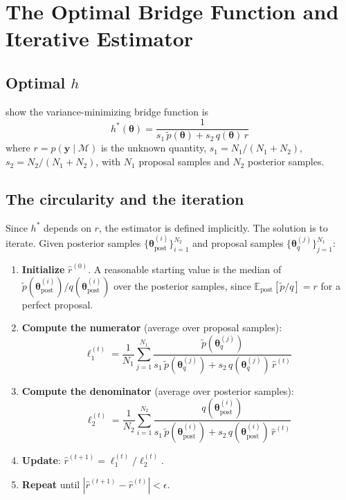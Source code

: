 \documentclass[11pt]{article}
\newcommand{\E}{\mathbb{E}}
\newcommand{\bth}{\boldsymbol{\theta}}
\newcommand{\by}{\mathbf{y}}
\newcommand{\cM}{\mathcal{M}}
\newcommand{\ptilde}{\tilde{p}}
\theoremstyle{plain}
\theoremstyle{definition}
\begin{document}
\section{The Optimal Bridge Function and Iterative Estimator}

\subsection{Optimal $h$}

\citet{MengWong1996} show the variance-minimizing bridge function is
\begin{equation}
  \label{eq:optimal_h}
  h^*(\bth) = \frac{1}{s_1\, \ptilde(\bth) + s_2\, q(\bth)\, r}
\end{equation}
where $r = p(\by \mid \cM)$ is the unknown quantity,
$s_1 = N_1 / (N_1 + N_2)$, $s_2 = N_2 / (N_1 + N_2)$, with $N_1$ proposal
samples and $N_2$ posterior samples.

\subsection{The circularity and the iteration}

Since $h^*$ depends on $r$, the estimator is defined implicitly. The solution
is to iterate. Given posterior samples
$\{\bth^{(i)}_\text{post}\}_{i=1}^{N_2}$ and proposal samples
$\{\bth^{(j)}_q\}_{j=1}^{N_1}$:

\begin{enumerate}[label=\textbf{Step \arabic*.}, leftmargin=2.5cm]
  \item \textbf{Initialize} $\hat{r}^{(0)}$. A reasonable starting value is
    the median of $\ptilde(\bth^{(i)}_\text{post}) / q(\bth^{(i)}_\text{post})$
    over the posterior samples, since
    $\E_\text{post}[\ptilde / q] = r$ for a perfect proposal.

  \item \textbf{Compute the numerator} (average over proposal samples):
    \begin{equation}
      \label{eq:numerator}
      \ell_1^{(t)} = \frac{1}{N_1} \sum_{j=1}^{N_1}
        \frac{\ptilde(\bth^{(j)}_q)}
             {s_1\, \ptilde(\bth^{(j)}_q) + s_2\, q(\bth^{(j)}_q)\, \hat{r}^{(t)}}
    \end{equation}

  \item \textbf{Compute the denominator} (average over posterior samples):
    \begin{equation}
      \label{eq:denominator}
      \ell_2^{(t)} = \frac{1}{N_2} \sum_{i=1}^{N_2}
        \frac{q(\bth^{(i)}_\text{post})}
             {s_1\, \ptilde(\bth^{(i)}_\text{post}) + s_2\,
              q(\bth^{(i)}_\text{post})\, \hat{r}^{(t)}}
    \end{equation}

  \item \textbf{Update}: $\hat{r}^{(t+1)} = \ell_1^{(t)} / \ell_2^{(t)}$.

  \item \textbf{Repeat} until $|\hat{r}^{(t+1)} - \hat{r}^{(t)}| < \epsilon$.
\end{enumerate}
\end{document}
